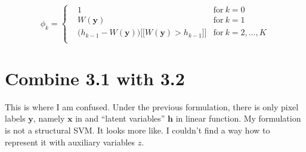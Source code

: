 \documentclass{article}
\begin{document}
	\begin{equation*}
	\phi_k = \left\{
	\begin{aligned}
	& 1	& \text{for} \ k=0\\
	& W(\mathbf{y}) & \text{for}\ k=1\\
	& \bigg(h_{k-1}-W(\mathbf{y}) \bigg)\bigg[\bigg[ W(\mathbf{y}) > h_{k-1}\bigg]\bigg]  & \text{for} \ k=2,\dots,K\\
	\end{aligned}
	\right.
	\end{equation*}
	
	\section{Combine 3.1 with 3.2}
	This is where I am confused. 
	Under the previous formulation, there is only pixel labels $\mathbf{y}$, namely $\mathbf{x}$ in \cite{yu2009learning} and ``latent variables'' $\mathbf{h}$ in linear function. My formulation is not a structural SVM. It 
	looks more like\cite{felzenszwalb2010object}. I couldn't find a way how to represent it with auxiliary variables $z$.
	
	
	\renewcommand\refname{Bibliography}
	
	
\end{document}
